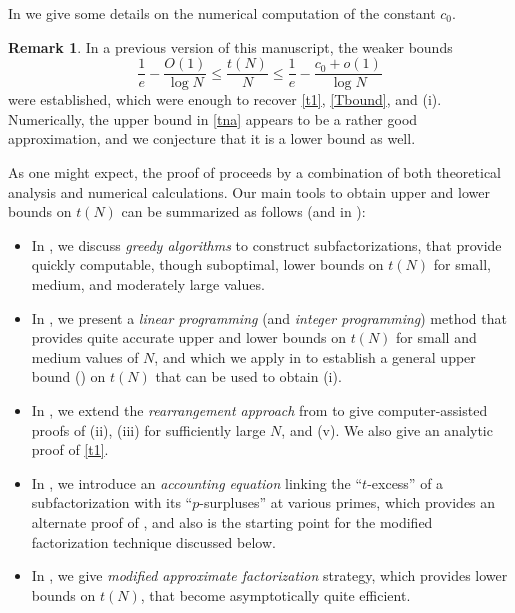 \documentclass[10pt,a4paper,reqno]{amsart}
\numberwithin{equation}{section}
\theoremstyle{plain}
\theoremstyle{definition}
\newtheorem{remark}[theorem]{Remark}
\begin{document}
In  we give some details on the numerical computation of the constant $c_0$.

\begin{remark}\label{old} In a previous version \cite{tao} of this manuscript, the weaker bounds
  $$ \frac{1}{e} - \frac{O(1)}{\log N} \leq \frac{t(N)}{N} \leq \frac{1}{e} - \frac{c_0+o(1)}{\log N}$$
were established, which were enough to recover \eqref{t1}, \eqref{Tbound}, and (i). Numerically, the upper bound in \eqref{tna} appears to be a rather good approximation, and we conjecture that it is a lower bound as well.
\end{remark}  


As one might expect, the proof of  proceeds by a combination of both theoretical analysis and numerical calculations.  Our main tools to obtain upper and lower bounds on $t(N)$ can be summarized as follows (and in ):

\begin{itemize}
  \item In , we discuss \emph{greedy algorithms} to construct subfactorizations, that provide quickly computable, though suboptimal, lower bounds on $t(N)$ for small, medium, and moderately large values.
  \item In , we present a \emph{linear programming} (and \emph{integer programming}) method that provides quite accurate upper and lower bounds on $t(N)$ for small and medium values of $N$, and which we apply in  to establish a general upper bound () on $t(N)$ that can be used to obtain (i).
  \item In , we extend the \emph{rearrangement approach} from \cite{guy-selfridge} to give computer-assisted proofs of (ii), (iii) for sufficiently large $N$, and (v).  We also give an analytic proof of \eqref{t1}.
  \item In , we introduce an \emph{accounting equation} linking the ``$t$-excess'' of a subfactorization with its ``$p$-surpluses'' at various primes, which provides an alternate proof of , and also is the starting point for the modified factorization technique discussed below.
  \item In , we give \emph{modified approximate factorization} strategy, which provides lower bounds on $t(N)$, that become asymptotically quite efficient.
\end{itemize}
\end{document}
